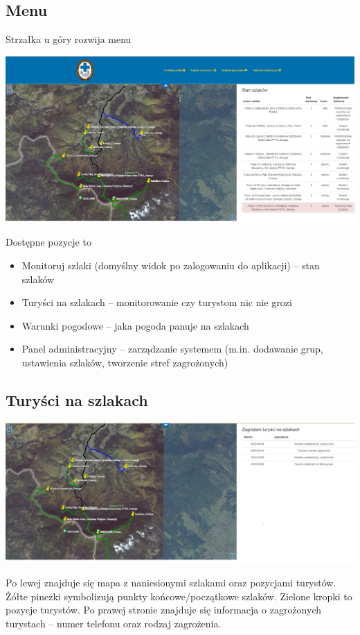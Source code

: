 \documentclass[a4paper,12pt]{article}
\begin{document}
\subsection{Menu}
Strzałka u góry rozwija menu
\begin{center}
\includegraphics[scale=0.4]{ui2.png}
\end{center}
Dostępne pozycje to
\begin{itemize}
\item Monitoruj szlaki (domyślny widok po zalogowaniu do aplikacji) -- stan szlaków
\item Turyści na szlakach -- monitorowanie czy turystom nic nie grozi
\item Warunki pogodowe -- jaka pogoda panuje na szlakach
\item Panel administracyjny -- zarządzanie systemem (m.in. dodawanie grup, ustawienia szlaków, tworzenie stref zagrożonych)
\end{itemize}
\subsection{Turyści na szlakach}
\begin{center}
\includegraphics[scale=0.4]{ui3.png}
\end{center}
Po lewej znajduje się mapa z naniesionymi szlakami oraz pozycjami turystów. Żółte pinezki symbolizują punkty końcowe/początkowe szlaków. Zielone kropki to pozycje turystów. Po prawej stronie znajduje się informacja o zagrożonych turystach -- numer telefonu oraz rodzaj zagrożenia.
\end{document}
